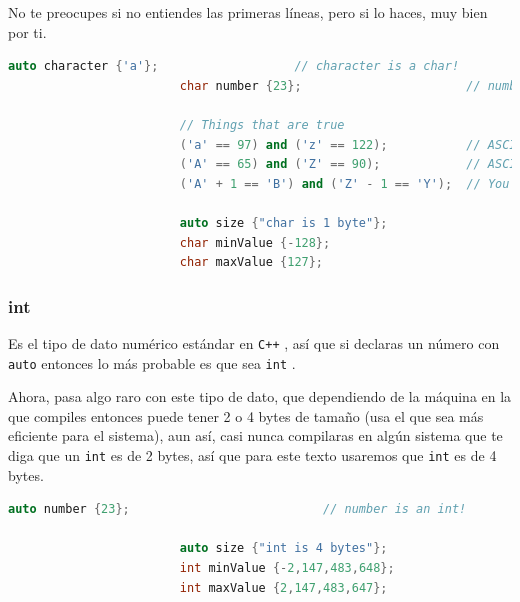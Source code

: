 \documentclass[12pt, fleqn]{report}                             %
\theoremstyle{break}                                            %
\newcommand{\textCode}[1]  { \texttt{#1} }                      %
\newcommand{\Cpp}{\ignorespaces\textCode{C++}}                  %
\begin{document}
                    No te preocupes si no entiendes las primeras líneas, pero si lo haces, muy bien por ti.
                    \begin{lstlisting}[language=C++, gobble=24]
                        auto character {'a'};                   // character is a char!
                        char number {23};                       // number is a char!

                        // Things that are true
                        ('a' == 97) and ('z' == 122);           // ASCII is just numbers
                        ('A' == 65) and ('Z' == 90);            // ASCII is just numbers
                        ('A' + 1 == 'B') and ('Z' - 1 == 'Y');  // You can do arithmetic

                        auto size {"char is 1 byte"};
                        char minValue {-128};
                        char maxValue {127};
                    \end{lstlisting}


                \clearpage
                \subsubsection{int}

                    Es el tipo de dato numérico estándar en \Cpp, así que si declaras un número
                    con \textCode{auto} entonces lo más probable es que sea \textCode{int}.

                    Ahora, pasa algo raro con este tipo de dato, que dependiendo de la máquina
                    en la que compiles entonces puede tener 2 o 4 bytes de tamaño (usa el que
                    sea más eficiente para el sistema), aun así, casi nunca compilaras en 
                    algún sistema que te diga que un \textCode{int} es de 2 bytes, así que para
                    este texto usaremos que \textCode{int} es de 4 bytes.
                    \begin{lstlisting}[language=C++, gobble=24]
                        auto number {23};                           // number is an int!

                        auto size {"int is 4 bytes"};
                        int minValue {-2,147,483,648};
                        int maxValue {2,147,483,647};
                    \end{lstlisting}
\end{document}
